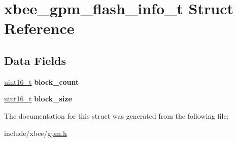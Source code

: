 \hypertarget{structxbee__gpm__flash__info__t}{}\section{xbee\+\_\+gpm\+\_\+flash\+\_\+info\+\_\+t Struct Reference}
\label{structxbee__gpm__flash__info__t}
\subsection*{Data Fields}
\begin{DoxyCompactItemize}
\item 
\mbox{\label{structxbee__gpm__flash__info__t_ab5753fcd037ea7610f6a87f85e626aec}} 
\hyperlink{group__hal__dos_ga5a8b2dc9e45a9ee81a94ef304fb62505}{uint16\+\_\+t} {\bfseries block\+\_\+count}
\item 
\mbox{\label{structxbee__gpm__flash__info__t_a9d83aa5f365f4a1b62dd70bd1ae426a3}} 
\hyperlink{group__hal__dos_ga5a8b2dc9e45a9ee81a94ef304fb62505}{uint16\+\_\+t} {\bfseries block\+\_\+size}
\end{DoxyCompactItemize}


The documentation for this struct was generated from the following file\+:\begin{DoxyCompactItemize}
\item 
include/xbee/\hyperlink{gpm_8h}{gpm.\+h}\end{DoxyCompactItemize}
